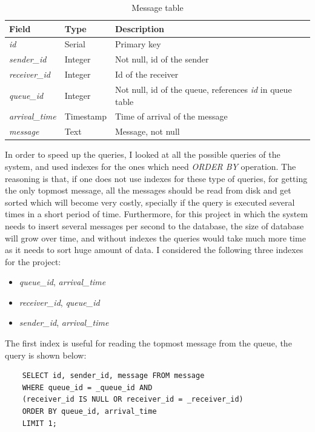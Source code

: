 \documentclass[11pt]{article}
\begin{document}
\begin{table}[!ht]
\centering
\begin{tabular}{lll}
\toprule
Field & Type & Description \\ \midrule
\emph{id}            & Serial    & Primary key \\
\emph{sender\_id}    & Integer   & Not null, id of the sender \\
\emph{receiver\_id}  & Integer   & Id of the receiver          \\
\emph{queue\_id}     & Integer   & Not null, id of the queue, references \emph{id} in queue table  \\
\emph{arrival\_time} & Timestamp & Time of arrival of the message   \\
\emph{message}       & Text      & Message, not null  \\\bottomrule
\end{tabular}
\caption{Message table}
\end{table}

In order to speed up the queries, I looked at all the possible queries of the 
system, and used indexes for the ones which need \emph{ORDER BY} operation. 
The reasoning is that, if one does not use indexes for these type of queries, 
for getting the only topmost message, all the messages should be read from
disk and get sorted which will become very costly, specially if the query is 
executed several times in a short period of time. Furthermore, for this project
in which the system needs to insert several messages per second to the database,
the size of database will grow over time, and without indexes the queries would take 
much more time as it needs to sort huge amount of data. I considered the following three indexes for the project:
\begin{itemize}
\item {\emph{queue\_id}, \emph{arrival\_time}}
\item {\emph{receiver\_id}, \emph{queue\_id}}
\item {\emph{sender\_id}, \emph{arrival\_time}}
\end{itemize}

The first index is useful for reading the topmost message from the queue, the 
query is shown below:

\begin{center}
\begin{tcolorbox}[width=\textwidth,title={Query topmost message in a queue for a 
particular receiver},outer arc=0mm]    
\begin{verbatim}
    SELECT id, sender_id, message FROM message
    WHERE queue_id = _queue_id AND 
    (receiver_id IS NULL OR receiver_id = _receiver_id)
    ORDER BY queue_id, arrival_time 
    LIMIT 1;  
\end{verbatim}
\end{tcolorbox}  
\end{center}
\end{document}

